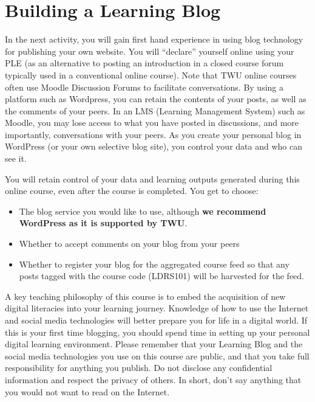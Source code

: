 \documentclass[
]{book}
\providecommand{\tightlist}{%
  \setlength{\itemsep}{0pt}\setlength{\parskip}{0pt}}
\theoremstyle{definition}
\theoremstyle{definition}
\theoremstyle{definition}
\theoremstyle{definition}
\theoremstyle{remark}
\begin{document}
\hypertarget{building-a-learning-blog}{%
\section{Building a Learning Blog}\label{building-a-learning-blog}}

In the next activity, you will gain first hand experience in using blog technology for publishing your own website. You will ``declare'' yourself online using your PLE (as an alternative to posting an introduction in a closed course forum typically used in a conventional online course). Note that TWU online courses often use Moodle Discussion Forums to facilitate conversations. By using a platform such as Wordpress, you can retain the contents of your posts, as well as the comments of your peers. In an LMS (Learning Management System) such as Moodle, you may lose access to what you have posted in discussions, and more importantly, conversations with your peers. As you create your personal blog in WordPress (or your own selective blog site), you control your data and who can see it.

You will retain control of your data and learning outputs generated during this online course, even after the course is completed.
You get to choose:

\begin{itemize}
\tightlist
\item
  The blog service you would like to use, although \textbf{we recommend WordPress as it is supported by TWU}.\\
\item
  Whether to accept comments on your blog from your peers\\
\item
  Whether to register your blog for the aggregated course feed so that any posts tagged with the course code (LDRS101) will be harvested for the feed.
\end{itemize}

A key teaching philosophy of this course is to embed the acquisition of new digital literacies into your learning journey. Knowledge of how to use the Internet and social media technologies will better prepare you for life in a digital world. If this is your first time blogging, you should spend time in setting up your personal digital learning environment. Please remember that your Learning Blog and the social media technologies you use on this course are public, and that you take full responsibility for anything you publish. Do not disclose any confidential information and respect the privacy of others. In short, don't say anything that you would not want to read on the Internet.
\end{document}
